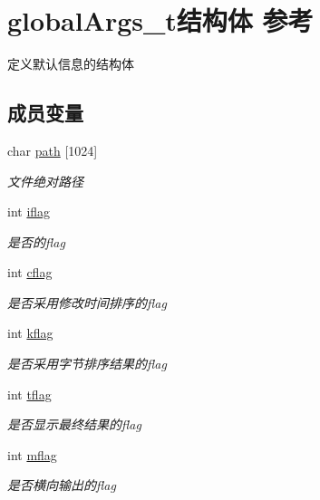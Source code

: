 \hypertarget{structglobal_args__t}{\section{global\-Args\-\_\-t结构体 参考}
\label{structglobal_args__t}
}


定义默认信息的结构体  


\subsection*{成员变量}
\begin{DoxyCompactItemize}
\item 
char \hyperlink{structglobal_args__t_a6f50c85874ef8f3405625e5a26febbcb}{path} \mbox{[}1024\mbox{]}
\begin{DoxyCompactList}\small\item\em 文件绝对路径 \end{DoxyCompactList}\item 
int \hyperlink{structglobal_args__t_ad532de65ced2a7f637c0cfa3a6e7e993}{iflag}
\begin{DoxyCompactList}\small\item\em 是否的flag \end{DoxyCompactList}\item 
int \hyperlink{structglobal_args__t_afbb9b1dda8ad9915e753c7a84be13489}{cflag}
\begin{DoxyCompactList}\small\item\em 是否采用修改时间排序的flag \end{DoxyCompactList}\item 
int \hyperlink{structglobal_args__t_ae2586d61cfd83f6d8ee1777eb20b54b0}{kflag}
\begin{DoxyCompactList}\small\item\em 是否采用字节排序结果的flag \end{DoxyCompactList}\item 
int \hyperlink{structglobal_args__t_ab3fe9f9160e69ccb1c2ec2762072a6a4}{tflag}
\begin{DoxyCompactList}\small\item\em 是否显示最终结果的flag \end{DoxyCompactList}\item 
int \hyperlink{structglobal_args__t_aa52c9d76427dab785a267dfb2c0242b1}{mflag}
\begin{DoxyCompactList}\small\item\em 是否横向输出的flag \end{DoxyCompactList}\item 

\end{DoxyCompactItemize}
